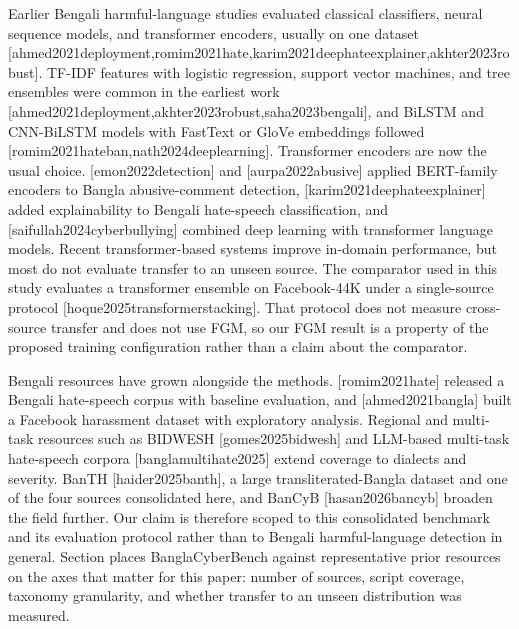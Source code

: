 \documentclass[11pt,a4paper]{article}
\def\citet#1{[#1]}%
\def\citep#1{[#1]}%
\def\Cref#1{Section}%
\newcommand{\bench}{BanglaCyberBench}
\begin{document}
Earlier Bengali harmful-language studies evaluated classical classifiers, neural sequence models, and transformer encoders, usually on one dataset \citep{ahmed2021deployment,romim2021hate,karim2021deephateexplainer,akhter2023robust}. TF-IDF features with logistic regression, support vector machines, and tree ensembles were common in the earliest work \citep{ahmed2021deployment,akhter2023robust,saha2023bengali}, and BiLSTM and CNN-BiLSTM models with FastText or GloVe embeddings followed \citep{romim2021hateban,nath2024deeplearning}. Transformer encoders are now the usual choice. \citet{emon2022detection} and \citet{aurpa2022abusive} applied BERT-family encoders to Bangla abusive-comment detection, \citet{karim2021deephateexplainer} added explainability to Bengali hate-speech classification, and \citet{saifullah2024cyberbullying} combined deep learning with transformer language models. Recent transformer-based systems improve in-domain performance, but most do not evaluate transfer to an unseen source. The comparator used in this study evaluates a transformer ensemble on Facebook-44K under a single-source protocol \citep{hoque2025transformerstacking}. That protocol does not measure cross-source transfer and does not use FGM, so our FGM result is a property of the proposed training configuration rather than a claim about the comparator.

Bengali resources have grown alongside the methods. \citet{romim2021hate} released a Bengali hate-speech corpus with baseline evaluation, and \citet{ahmed2021bangla} built a Facebook harassment dataset with exploratory analysis. Regional and multi-task resources such as BIDWESH \citep{gomes2025bidwesh} and LLM-based multi-task hate-speech corpora \citep{banglamultihate2025} extend coverage to dialects and severity. BanTH \citep{haider2025banth}, a large transliterated-Bangla dataset and one of the four sources consolidated here, and BanCyB \citep{hasan2026bancyb} broaden the field further. Our claim is therefore scoped to this consolidated benchmark and its evaluation protocol rather than to Bengali harmful-language detection in general. \Cref{tab:priordata} places \bench{} against representative prior resources on the axes that matter for this paper: number of sources, script coverage, taxonomy granularity, and whether transfer to an unseen distribution was measured.
\end{document}
